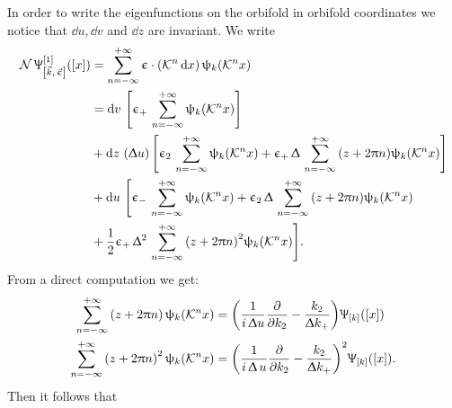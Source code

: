 In order to write the eigenfunctions on the orbifold in orbifold coordinates we notice that $\dd{u}, \dd{v}$ and $\dd{z}$ are invariant.
We write
\begin{equation}
  \begin{split}
    \cN\,
    \Psi^{[1]}_{\qty[\vec{k},\, \vec{\epsilon}]}\qty(\qty[x])
    & =
    \infinfsum{n}
    \epsilon \cdot \qty( \cK^n \dd{x})\,
    \psi_{k}( \cK^n x)
    \\
    & =
    \dd{v}\,
    \qty[ \epsilon_+\, \infinfsum{n} \psi_k\qty( \cK^n x) ]
    \\
    & +
    \dd{z}\,
    \qty(\Delta u)\,
    \qty[%
      \epsilon_2\, \infinfsum{n} \psi_k\qty( \cK^n x)
      +
      \epsilon_+\, \Delta\, \infinfsum{n} \qty(z + 2\pi n) \psi_k\qty(\cK^n x)
    ]
    \\
    & +
    \dd{u}\,
    \Biggl[
      \epsilon_-\, \infinfsum{n} \psi_k\qty(\cK^n x)
      +
      \epsilon_2\, \Delta\, \infinfsum{n} \qty(z + 2 \pi n) \psi_k\qty(\cK^n x)
      \\
      & +
      \frac{1}{2} \epsilon_+\, \Delta^2\, \infinfsum{n} \qty(z + 2 \pi n)^2 \psi_k(\cK^n x)
    \Biggr].
  \end{split}
\end{equation}
From a direct computation we get:\footnotemark{}
\begin{equation}
  \begin{split}
    \infinfsum{n} \qty(z + 2\pi n)\, \psi_k(\cK^n x)
    & =
    \qty(%
      \frac{1}{i\, \Delta u}
      \pdv{}{k_2}
      -
      \frac{k_2}{\Delta k_+}
    )
    \Psi_{\qty[k]}\qty(\qty[x])
    \\
    \infinfsum{n} \qty(z + 2\pi n)^2\, \psi_k(\cK^n x)
    & =
    \qty(%
      \frac{1}{i\, \Delta\, u}
      \pdv{}{k_2}
      -
      \frac{k_2}{\Delta k_+}
    )^2
    \Psi_{\qty[k]}\qty(\qty[x]).
  \end{split}
  \label{eq:sum_z_psi}
\end{equation}
Then it follows that
